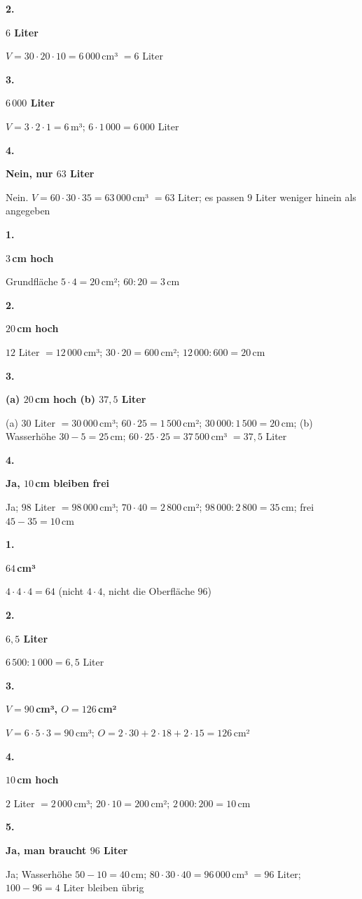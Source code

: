 \documentclass[11pt]{article}
\newcommand{\lsg}[3]{\par\noindent\begin{minipage}[t]{9mm}\textbf{#1}\end{minipage}%
  \begin{minipage}[t]{52mm}\raggedright\bfseries\boldmath #2\end{minipage}\hspace{3mm}%
  \begin{minipage}[t]{\dimexpr\linewidth-64mm\relax}\raggedright\small #3\end{minipage}\par\vspace{4pt}}
\begin{document}
\lsg{2.}{$6$ Liter}{$V = 30 \cdot 20 \cdot 10 = 6\,000$\,cm³ $= 6$ Liter}
\lsg{3.}{$6\,000$ Liter}{$V = 3 \cdot 2 \cdot 1 = 6$\,m³; $6 \cdot 1\,000 = 6\,000$ Liter}
\lsg{4.}{Nein, nur $63$ Liter}{Nein. $V = 60 \cdot 30 \cdot 35 = 63\,000$\,cm³ $= 63$ Liter; es passen $9$ Liter weniger hinein als angegeben}
\par\Needspace{25mm}\vspace{6pt}\noindent\colorbox{black!12}{}\hspace{2mm}{\bfseries Höhe aus dem Volumen}\par\vspace{4pt}
\lsg{1.}{$3$\,cm hoch}{Grundfläche $5 \cdot 4 = 20$\,cm²; $60 : 20 = 3$\,cm}
\lsg{2.}{$20$\,cm hoch}{$12$ Liter $= 12\,000$\,cm³; $30 \cdot 20 = 600$\,cm²; $12\,000 : 600 = 20$\,cm}
\lsg{3.}{(a) $20$\,cm hoch (b) $37{,}5$ Liter}{(a) $30$ Liter $= 30\,000$\,cm³; $60 \cdot 25 = 1\,500$\,cm²; $30\,000 : 1\,500 = 20$\,cm; (b) Wasserhöhe $30 - 5 = 25$\,cm; $60 \cdot 25 \cdot 25 = 37\,500$\,cm³ $= 37{,}5$ Liter}
\lsg{4.}{Ja, $10$\,cm bleiben frei}{Ja; $98$ Liter $= 98\,000$\,cm³; $70 \cdot 40 = 2\,800$\,cm²; $98\,000 : 2\,800 = 35$\,cm; frei $45 - 35 = 10$\,cm}
\par\Needspace{25mm}\vspace{6pt}\noindent\colorbox{black!12}{}\hspace{2mm}{\bfseries Probetest}\par\vspace{4pt}
\lsg{1.}{$64$\,cm³}{$4 \cdot 4 \cdot 4 = 64$ (nicht $4 \cdot 4$, nicht die Oberfläche $96$)}
\lsg{2.}{$6{,}5$ Liter}{$6\,500 : 1\,000 = 6{,}5$ Liter}
\lsg{3.}{$V = 90$\,cm³, $O = 126$\,cm²}{$V = 6 \cdot 5 \cdot 3 = 90$\,cm³; $O = 2 \cdot 30 + 2 \cdot 18 + 2 \cdot 15 = 126$\,cm²}
\lsg{4.}{$10$\,cm hoch}{$2$ Liter $= 2\,000$\,cm³; $20 \cdot 10 = 200$\,cm²; $2\,000 : 200 = 10$\,cm}
\lsg{5.}{Ja, man braucht $96$ Liter}{Ja; Wasserhöhe $50 - 10 = 40$\,cm; $80 \cdot 30 \cdot 40 = 96\,000$\,cm³ $= 96$ Liter; $100 - 96 = 4$ Liter bleiben übrig}
\end{document}
